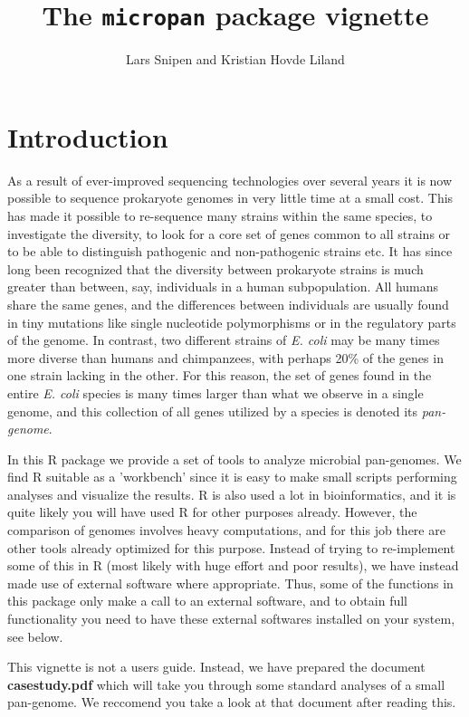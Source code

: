 \documentclass{article}
\title{The \texttt{micropan} package vignette}
\author{Lars Snipen and Kristian Hovde Liland}
\date{}
\begin{document}


\maketitle

\section{Introduction}
As a result of ever-improved sequencing technologies over several years it is now possible to sequence prokaryote genomes in very little time at a small cost. This has made it possible to re-sequence many strains within the same species, to investigate the diversity, to look for a core set of genes common to all strains or to be able to distinguish pathogenic and non-pathogenic strains etc. It has since long been recognized that the diversity between prokaryote strains is much greater than between, say, individuals in a human subpopulation. All humans share the same genes, and the differences between individuals are usually found in tiny mutations like single nucleotide polymorphisms or in the regulatory parts of the genome. In contrast, two different strains of \emph{E. coli} may be many times more diverse than humans and chimpanzees, with perhaps 20\% of the genes in one strain lacking in the other. For this reason, the set of genes found in the entire \emph{E. coli} species is many times larger than what we observe in a single genome, and this collection of all genes utilized by a species is denoted its \emph{pan-genome}.

In this R package we provide a set of tools to analyze microbial pan-genomes. We find R suitable as a 'workbench' since it is easy to make small scripts performing analyses and visualize the results. R is also used a lot in bioinformatics, and it is quite likely you will have used R for other purposes already. However, the comparison of genomes involves heavy computations, and for this job there are other tools already optimized for this purpose. Instead of trying to re-implement some of this in R (most likely with huge effort and poor results), we have instead made use of external software where appropriate. Thus, some of the functions in this package only make a call to an external software, and to obtain full functionality you need to have these external softwares installed on your system, see below.

This vignette is not a users guide. Instead, we have prepared the document {\bf casestudy.pdf} which will take you through some standard analyses of a small pan-genome. We reccomend you take a look at that document after reading this.
\end{document}

